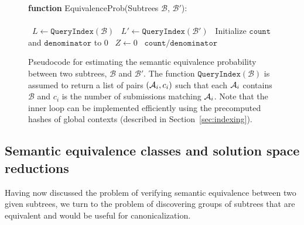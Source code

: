 \begin{figure}[ht]
\begin{center}
\begin{algorithm2e}[H]
{\bf function} {\sc EquivalenceProb}\xspace(Subtrees $\mathcal{B}$, $\mathcal{B}'$): \\ 
\mbox{}\\
\ $L \leftarrow \texttt{QueryIndex}(\mathcal{B})$ \;
\ $L' \leftarrow \texttt{QueryIndex}(\mathcal{B'})$ \;
\ Initialize $\texttt{count}$ and $\texttt{denominator}$ to 0\;
\ $Z \leftarrow 0$\;
\ForEach{AST $\AST_i \in L$}{ 
	\If{$\AST_i\backslash \mathcal{B} = \AST_i'\backslash \mathcal{B}'$ for some $\AST_i'\in L'$}{
\	$w_i \leftarrow c_i*c_i'$ \;
\	$\texttt{count} \leftarrow \texttt{count} + w_i$ if $F[\AST_i]=F[\AST_i']$ \;
\	$\texttt{denominator} \leftarrow \texttt{denominator} + w $ \;
	}
}
\ \Return $\texttt{count}/\texttt{denominator}$ \;
\end{algorithm2e}
\caption[Algorithm for estimating semantic equivalence]{Pseudocode for estimating the semantic equivalence probability between two subtrees, $\mathcal{B}$ and $\mathcal{B}'$.  
The function $\texttt{QueryIndex}(\mathcal{B})$ is assumed to return a list of pairs $(\mathcal{A}_i,c_i)$ such that each $\mathcal{A}_i$ contains $\mathcal{B}$
and $c_i$ is the number of submissions matching $\mathcal{A}_i$.   Note that the inner loop can be implemented efficiently using 
the precomputed hashes of global contexts (described in Section~\ref{sec:indexing}).
}
\label{alg:estimate}

\end{center}
\end{figure}


\subsection{Semantic equivalence classes and solution space reductions}	\label{sec:reduction}
Having now discussed the problem of verifying semantic equivalence between two given subtrees,
we turn to the problem of discovering groups of subtrees that are equivalent and would be useful for canonicalization.

